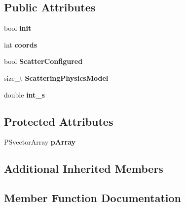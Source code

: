 \subsection*{Public Attributes}
\begin{DoxyCompactItemize}
\item 
\mbox{\label{classParticleTracking_1_1ParticleBunch_a1bf78134a9ed7ecbfc680bdb0a6c6906}} 
bool {\bfseries init}
\item 
\mbox{\label{classParticleTracking_1_1ParticleBunch_afe847ece1c0d2567d05a0d9350e7c227}} 
int {\bfseries coords}
\item 
\mbox{\label{classParticleTracking_1_1ParticleBunch_a4d0d0ceb8f238166f3e5159c432f33b4}} 
bool {\bfseries Scatter\+Configured}
\item 
\mbox{\label{classParticleTracking_1_1ParticleBunch_a78c8a17f4a0d186dbb70f3d3112415a6}} 
size\+\_\+t {\bfseries Scattering\+Physics\+Model}
\item 
\mbox{\label{classParticleTracking_1_1ParticleBunch_aa34efe72ed687ffc050fd7800f04576b}} 
double {\bfseries int\+\_\+s}
\end{DoxyCompactItemize}
\subsection*{Protected Attributes}
\begin{DoxyCompactItemize}
\item 
\mbox{\label{classParticleTracking_1_1ParticleBunch_aedf794a9d1605091b26e57a018d66688}} 
P\+Svector\+Array {\bfseries p\+Array}
\end{DoxyCompactItemize}
\subsection*{Additional Inherited Members}


\subsection{Member Function Documentation}
\mbox{\label{classParticleTracking_1_1ParticleBunch_aa722546fa53e2299c66aece41ee8c813}} 
